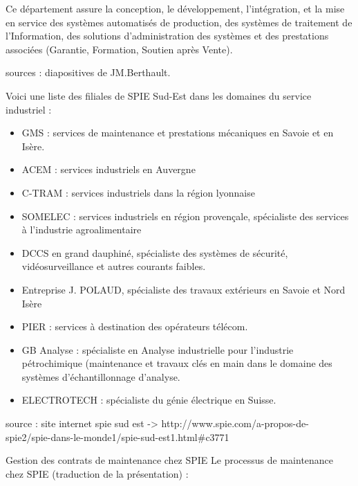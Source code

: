 Ce département assure la conception, le développement, l’intégration, et la mise en service des systèmes automatisés de production, des systèmes de traitement de l’Information, des solutions d’administration des systèmes et des prestations associées (Garantie, Formation, Soutien après Vente).

sources : diapositives de JM.Berthault.

Voici une liste des filiales de SPIE Sud-Est dans les domaines du service industriel :

\begin{itemize}
\item GMS : services de maintenance et prestations mécaniques en Savoie et en Isère.
\item ACEM : services industriels en Auvergne
\item C-TRAM : services industriels dans la région lyonnaise
\item SOMELEC : services industriels en région provençale, spécialiste des services à l’industrie agroalimentaire
\item DCCS en grand dauphiné, spécialiste des systèmes de sécurité, vidéosurveillance et autres courants faibles.
\item Entreprise J. POLAUD, spécialiste des travaux extérieurs en Savoie et Nord Isère
\item PIER : services à destination des opérateurs télécom.
\item GB Analyse : spécialiste en Analyse industrielle pour l’industrie pétrochimique (maintenance et travaux clés en main dans le domaine des systèmes d’échantillonnage d’analyse.
\item ELECTROTECH : spécialiste du génie électrique en Suisse.
\end{itemize}

source : site internet spie sud est ->
http://www.spie.com/a-propos-de-spie2/spie-dans-le-monde1/spie-sud-est1.html#c3771

Gestion des contrats de maintenance chez SPIE
Le processus de maintenance chez SPIE (traduction de la présentation) :

